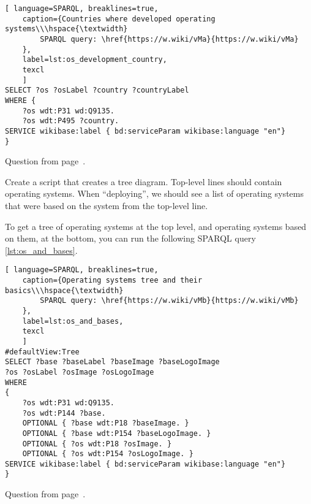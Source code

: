 \begin{lstlisting}[ language=SPARQL, breaklines=true, 
	caption={Countries where developed operating systems\\\hspace{\textwidth}
		SPARQL query: \href{https://w.wiki/vMa}{https://w.wiki/vMa}
	},
	label=lst:os_development_country,
	texcl 
	]
SELECT ?os ?osLabel ?country ?countryLabel
WHERE {
	?os wdt:P31 wd:Q9135.
	?os wdt:P495 ?country.
SERVICE wikibase:label { bd:serviceParam wikibase:language "en"}
}
\end{lstlisting}

Question from page~\pageref{tasks:operating_system_tasks}.

\begin{exercise}
	\label{answer:os_and_bases}
	Create a script that creates a tree diagram. Top-level lines should contain operating systems. When ``deploying'', we should see a list of operating systems that were based on the system from the top-level line.
\end{exercise}
To get a tree of operating systems at the top level, and operating systems based on them, at the bottom, you can run the following SPARQL query \ref{lst:os_and_bases}.

\begin{lstlisting}[ language=SPARQL, breaklines=true, 
	caption={Operating systems tree and their basics\\\hspace{\textwidth}
		SPARQL query: \href{https://w.wiki/vMb}{https://w.wiki/vMb}
	},
	label=lst:os_and_bases,
	texcl 
	]
#defaultView:Tree
SELECT ?base ?baseLabel ?baseImage ?baseLogoImage
?os ?osLabel ?osImage ?osLogoImage
WHERE
{
	?os wdt:P31 wd:Q9135. 
	?os wdt:P144 ?base.
	OPTIONAL { ?base wdt:P18 ?baseImage. }
	OPTIONAL { ?base wdt:P154 ?baseLogoImage. }
	OPTIONAL { ?os wdt:P18 ?osImage. }
	OPTIONAL { ?os wdt:P154 ?osLogoImage. }
SERVICE wikibase:label { bd:serviceParam wikibase:language "en"}
}
\end{lstlisting}

Question from page~\pageref{tasks:operating_system_tasks}.


